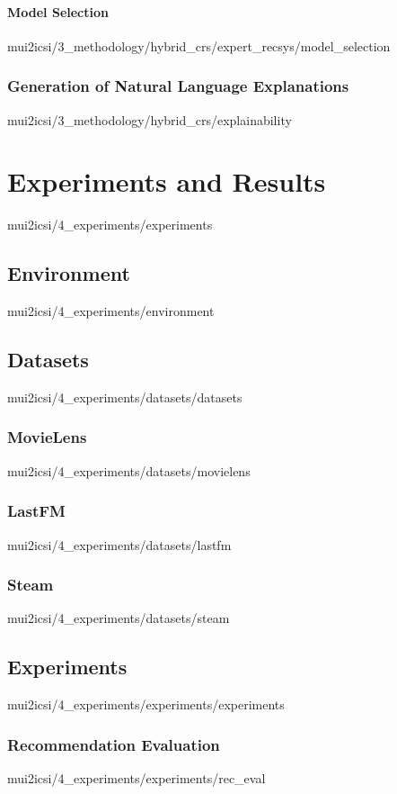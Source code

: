 \documentclass[english,epsbased,copyright,final,printable,covers,extendedindex,firstnumbered,tfm,gnuplot,loc,loe,lof,lot]{tfgtfmthesisuam}
\begin{document}
        \subsubsection{Model Selection\label{SSS:MODELSELECT}}{mui2icsi/3_methodology/hybrid_crs/expert_recsys/model_selection}
      \subsection{Generation of Natural Language Explanations\label{SS:GENEXPLAIN}}{mui2icsi/3_methodology/hybrid_crs/explainability}

  \chapter{Experiments and Results\label{CAP:EXPRES}}{mui2icsi/4_experiments/experiments}
    \section{Environment\label{SEC:ENVIRONMENT}}{mui2icsi/4_experiments/environment}

    \section{Datasets\label{SEC:DATASETS}}{mui2icsi/4_experiments/datasets/datasets}
      \subsection{MovieLens\label{SS:MOVIELENS}}{mui2icsi/4_experiments/datasets/movielens}
      \subsection{LastFM\label{SS:LASTFM}}{mui2icsi/4_experiments/datasets/lastfm}
      \subsection{Steam\label{SS:STEAM}}{mui2icsi/4_experiments/datasets/steam}

    \section{Experiments\label{SEC:EXPERIMENTS}}{mui2icsi/4_experiments/experiments/experiments}
      \subsection{Recommendation Evaluation\label{SS:RECEVAL}}{mui2icsi/4_experiments/experiments/rec_eval}
\end{document}
